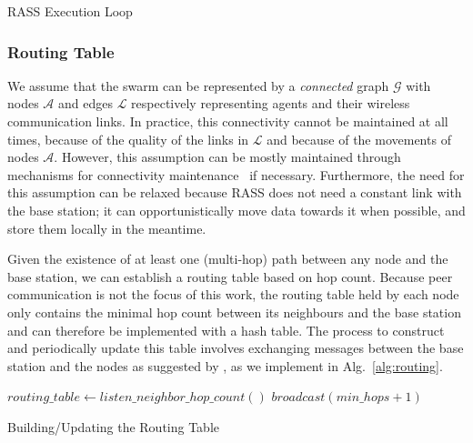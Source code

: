 \documentclass[runningheads]{llncs}
\begin{document}
\begin{algorithm}[h]
\small
\SetAlgoLined
\DontPrintSemicolon
 \caption{RASS Execution Loop}
 \label{alg:rass}
\end{algorithm}



\subsubsection{Routing Table}
\label{section:routingTable}
We assume that the swarm can be represented by a
\textit{connected} graph
$\mathcal{G}$ with nodes $\mathcal{A}$ and edges $\mathcal{L}$
respectively representing agents and their wireless communication
links. In practice, this connectivity cannot be maintained at all times, because of the quality of the links in $\mathcal{L}$ and because of the movements of nodes $\mathcal{A}$. However, this assumption can be mostly maintained through mechanisms for connectivity maintenance~\cite{varadharajan2020swarm} if necessary. Furthermore, the need for this assumption can be relaxed because RASS does not need a constant link with the base station; it can opportunistically move data towards it when possible, and store them locally in the meantime.

Given the existence of at least one (multi-hop) path between any node and the base station, 
we can establish a routing table based on hop count. Because peer communication is not the 
focus of this work, the routing table held by each node only contains the minimal hop count 
between its neighbours and the base station and can therefore
be implemented with a hash table. The process to construct and periodically update this 
table involves exchanging messages between the base station and the nodes as suggested by 
\cite{abdullah2015detecting}, as we implement in Alg.~\ref{alg:routing}. 

\begin{algorithm}[h]
\small
\SetAlgoLined
\DontPrintSemicolon
    $routing\_table \longleftarrow listen\_neighbor\_hop\_count()$\;
    \;
    \;
    $broadcast(min\_hops + 1)$\;
\caption{Building/Updating the Routing Table}
\label{alg:routing}
\end{algorithm}
\end{document}
